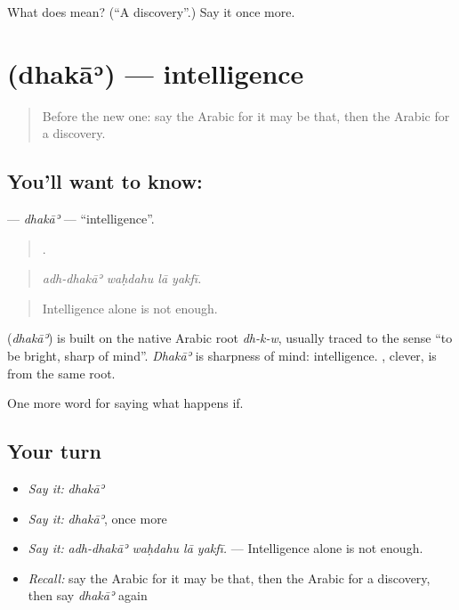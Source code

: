 \begin{tcolorbox}[breakable,colback=teal!4,colframe=teal!35!black,title={Before you move on}]
What does  mean? (\textquotedblleft{}A discovery\textquotedblright{}.) Say it once more.
\end{tcolorbox}
\section[\texorpdfstring{\ar{ذكاء} (dhakāʾ)}{ذكاء (dhakāʾ)}]{ (dhakāʾ) — intelligence}

\label{lesson:AR-C421-dhaka}



\begin{quote}
Before the new one: say the Arabic for it may be that, then the Arabic for a discovery.
\end{quote}

\subsection*{You'll want to know: }
\textbf{} — \emph{dhakāʾ} — \textquotedblleft{}intelligence\textquotedblright{}.

\begin{quote}
   .
\end{quote}

\begin{quote}
\emph{adh-dhakāʾ waḥdahu lā yakfī.}
\end{quote}

\begin{quote}
Intelligence alone is not enough.
\end{quote}

\begin{cousinweb}
\textbf{} (\emph{dhakāʾ}) is built on the native Arabic root \emph{dh-k-w}, usually traced to the sense \textquotedblleft{}to be bright, sharp of mind\textquotedblright{}. \emph{Dhakāʾ} is sharpness of mind: intelligence. , clever, is from the same root.
\end{cousinweb}

\begin{grammarlens}[title={What you've built}]
One more word for saying what happens if.
\end{grammarlens}

\subsection*{Your turn}
\begin{itemize}
\raggedright
  \item \emph{Say it:} \emph{dhakāʾ}
  \item \emph{Say it:} \emph{dhakāʾ}, once more
  \item \emph{Say it:} \emph{adh-dhakāʾ waḥdahu lā yakfī.} — Intelligence alone is not enough.
  \item \emph{Recall:} say the Arabic for it may be that, then the Arabic for a discovery, then say \emph{dhakāʾ} again
\end{itemize}


